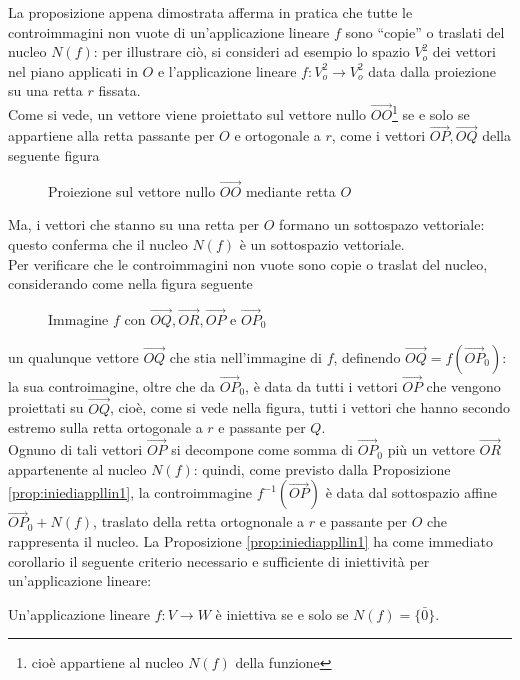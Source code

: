 La proposizione appena dimostrata afferma in pratica che tutte le controimmagini non vuote di
un'applicazione lineare $f$ sono ``copie'' o traslati del nucleo $N(f)$: per illustrare ciò,
si consideri ad esempio lo spazio $V_o^2$ dei vettori nel piano applicati in $O$ e l'applicazione
lineare $f:V_o^2\to V_o^2$ data dalla proiezione su una retta $r$ fissata.\\
Come si vede, un vettore viene proiettato sul vettore nullo $\vec{OO}$\footnote{cioè appartiene al
  nucleo $N(f)$ della funzione} se e solo se appartiene alla retta passante per $O$ e ortogonale a $r$,
come i vettori $\vec{OP}, \vec{OQ}$ della seguente figura
\begin{figure}[ht!]
  \centering
  \resizebox{7cm}{!}{}
  \caption{Proiezione sul vettore nullo $\vec{OO}$ mediante retta $O$}
  \label{fig:iniediappllin2}
\end{figure}
Ma, i vettori che stanno su una retta per $O$ formano un sottospazo vettoriale: questo conferma che
il nucleo $N(f)$ è un sottospazio vettoriale.\\
Per verificare che le controimmagini non vuote sono copie o traslat del nucleo, considerando come nella
figura seguente
\clearpage
\begin{figure}[ht!]
  \centering
  \resizebox{5cm}{!}{}
  \caption{Immagine $f$ con $\vec{OQ},\vec{OR},\vec{OP}$ e $\vec{OP}_0$}
  \label{fig:iniediappllin3}
\end{figure}
un qualunque vettore $\vec{OQ}$ che stia nell'immagine di $f$, definendo $\vec{OQ}=f(\vec{OP}_0)$:
la sua controimagine, oltre che da $\vec{OP}_0$, è data da tutti i vettori $\vec{OP}$ che vengono
proiettati su $\vec{OQ}$, cioè, come si vede nella figura, tutti i vettori che hanno secondo estremo
sulla retta ortogonale a $r$ e passante per $Q$.\\
Ognuno di tali vettori $\vec{OP}$ si decompone come somma di $\vec{OP}_0$ più un vettore $\vec{OR}$
appartenente al nucleo $N(f)$: quindi, come previsto dalla Proposizione \ref{prop:iniediappllin1},
la controimmagine $f^{-1}(\vec{OP})$ è data dal sottospazio affine $\vec{OP}_0+N(f)$, traslato della
retta ortognonale a $r$ e passante per $O$ che rappresenta il nucleo. La Proposizione
\ref{prop:iniediappllin1} ha come immediato corollario il seguente criterio necessario e sufficiente
di iniettività per un'applicazione lineare:
\begin{corol}
  \label{corol:iniediappllin1}
  Un'applicazione lineare $f:V\to W$ è iniettiva se e solo se $N(f)=\{\bar{0}\}$. 
\end{corol}
